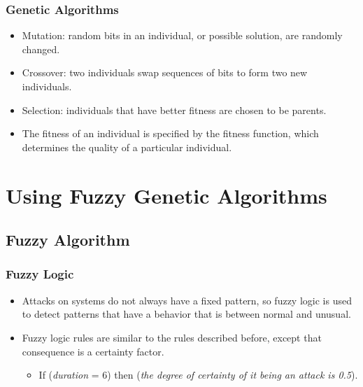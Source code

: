 \documentclass{beamer}
\begin{document}
\begin{frame}
  \frametitle{Genetic Algorithms}
	\begin{itemize}
        \item Mutation: random bits in an individual, or possible solution, are randomly changed.
        \item Crossover: two individuals swap sequences of bits to form two new individuals.
        \item Selection: individuals that have better fitness are chosen to be parents.
        \item The fitness of an individual is specified by the fitness function, which determines the quality of a particular individual.
	\end{itemize}
\end{frame}
\section[Using Fuzzy Genetic Algorithms]{Using Fuzzy Genetic Algorithms}

\subsection{Fuzzy Algorithm}

\begin{frame}
	\frametitle{Fuzzy Logic}
	\begin{itemize}
		\item Attacks on systems do not always have a fixed pattern, so fuzzy logic is used to detect patterns that have a behavior that is between normal and unusual.
		\item Fuzzy logic rules are similar to the rules described before, except that
consequence is a certainty factor. 
		\begin{itemize}
			\item If (\emph{duration} = 6) then (\emph{the degree of certainty of it being an attack is 0.5}).
		\end{itemize}
	\end{itemize}
\end{frame}
\end{document}
